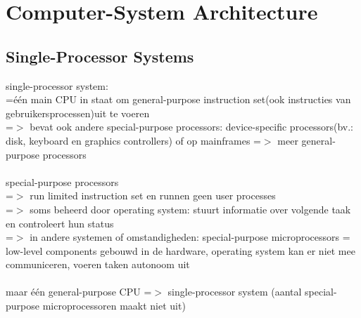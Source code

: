 \documentclass{report}
\begin{document}
\section{Computer-System Architecture}
\subsection{Single-Processor Systems}
single-processor system:
\\=\'e\'en main CPU in staat om general-purpose instruction set(ook instructies van gebruikersprocessen)uit te voeren
\\=$>$ bevat ook andere special-purpose processors: device-specific processors(bv.: disk, keyboard en graphics controllers) of op mainframes =$>$ meer general-purpose processors
\\
\\special-purpose processors 
\\=$>$ run limited instruction set en runnen geen user processes
\\=$>$ soms beheerd door operating system: stuurt informatie over volgende taak en controleert hun status
\\=$>$ in andere systemen of omstandigheden: special-purpose microprocessors = low-level components gebouwd in de hardware, operating system kan er niet mee communiceren, voeren taken autonoom uit
\\
\\ maar \'e\'en general-purpose CPU =$>$ single-processor system (aantal special-purpose microprocessoren maakt niet uit)
\end{document}
